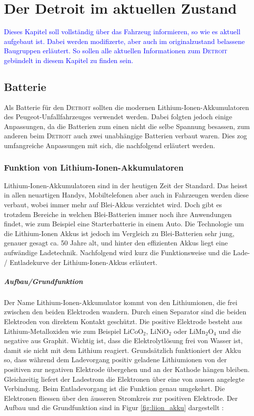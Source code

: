 \chapter{Der Detroit im aktuellen Zustand}\label{aktuell}

\textcolor{blue}{Dieses Kapitel soll vollständig über das Fahrzeug informieren, so wie es aktuell aufgebaut ist. Dabei werden modifizerte, aber auch im originalzustand belassene Baugruppen erläutert. So sollen alle aktuellen Informationen zum \textsc{Detroit} gebündelt in diesem Kapitel zu finden sein.}

\section{Batterie}
Als Batterie für den \textsc{Detroit} sollten die modernen Lithium-Ionen-Akkumulatoren des Peugeot-Unfallfahrzeuges verwendet werden. Dabei folgten jedoch einige Anpassungen, da die Batterien zum einen nicht die selbe Spannung besassen, zum anderen beim \textsc{Detroit} auch zwei unabhängige Batterien verbaut waren. Dies zog umfangreiche Anpassungen mit sich, die nachfolgend erläutert werden.

\subsection{Funktion von Lithium-Ionen-Akkumulatoren} \label{kap_liion}

Lithium-Ionen-Akkumulatoren sind in der heutigen Zeit der Standard. Das heisst in allen neuartigen Handys, Mobiltelefonen aber auch in Fahrzeugen werden diese verbaut, wobei immer mehr auf Blei-Akkus verzichtet wird. Doch gibt es trotzdem Bereiche in welchen Blei-Batterien immer noch ihre Anwendungen findet, wie zum Beispiel eine Starterbatterie in einem Auto. Die Technologie um die Lithium-Ionen Akkus ist jedoch im Vergleich zu Blei-Batterien sehr jung, genauer gesagt ca. 50 Jahre alt, und hinter den effizienten Akkus liegt eine aufwändige Ladetechnik. Nachfolgend wird kurz die Funktionsweise und die Lade- / Entladekurve der Lithium-Ionen-Akkus erläutert.

\paragraph{Aufbau/Grundfunktion}
Der Name Lithium-Ionen-Akkumulator kommt von den Lithiumionen, die frei zwischen den beiden Elektroden wandern. Durch einen Separator sind die beiden Elektroden von direktem Kontakt geschützt. Die positive Elektrode besteht aus Lithium-Metalloxiden wie zum Beispiel LiCoO$_2$, LiNiO$_2$ oder LiMn$_2$O$_4$ und die negative aus Graphit. Wichtig ist, dass die Elektrolytlösung frei von Wasser ist, damit sie nicht mit dem Lithium reagiert.
Grundsätzlich funktioniert der Akku so, dass während dem Ladevorgang positiv geladene Lithiumionen von der positiven zur negativen Elektrode übergehen und an der Kathode hängen bleiben. Gleichzeitig liefert der Ladestrom die Elektronen über eine von aussen angelegte Verbindung. Beim Entladevorgang ist die Funktion genau umgekehrt. Die Elektronen fliessen über den äusseren Stromkreis zur positiven Elektrode. Der Aufbau und die Grundfunktion sind in Figur \ref{fig:liion_akku} dargestellt \cite{liion_akku_aufbau_funktion2}:

